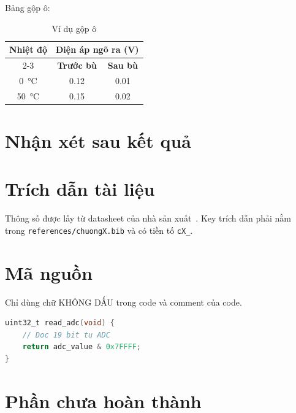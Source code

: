 Bảng gộp ô:
\begin{table}[H]
    \centering
    \caption{Ví dụ gộp ô}
    \label{tab:cX:gop-o}
    \renewcommand{\arraystretch}{1.3}
    \begin{tabular}{|c|c|c|}
        \hline
        \multirow{2}{*}{\textbf{Nhiệt độ}} & \multicolumn{2}{c|}{\textbf{Điện áp ngõ ra (\unit{\volt})}} \\ \cline{2-3}
        & \textbf{Trước bù} & \textbf{Sau bù} \\ \hline
        \qty{0}{\celsius}  & 0.12 & 0.01 \\ \hline
        \qty{50}{\celsius} & 0.15 & 0.02 \\ \hline
    \end{tabular}
\end{table}

\section{Nhận xét sau kết quả}
\label{sec:cX:nhan-xet}


\section{Trích dẫn tài liệu}
\label{sec:cX:trich-dan}

Thông số được lấy từ datasheet của nhà sản xuất~\cite{c3_ina333}.
Key trích dẫn phải nằm trong \texttt{references/chuongX.bib} và có tiền tố \texttt{cX\_}.

\section{Mã nguồn}
\label{sec:cX:ma-nguon}

Chỉ dùng chữ KHÔNG DẤU trong code và comment của code.
\begin{lstlisting}[language=C, caption={Doc gia tri ADC}, label={lst:cX:doc-adc}]
uint32_t read_adc(void) {
    // Doc 19 bit tu ADC
    return adc_value & 0x7FFFF;
}
\end{lstlisting}

\section{Phần chưa hoàn thành}
\label{sec:cX:todo}

